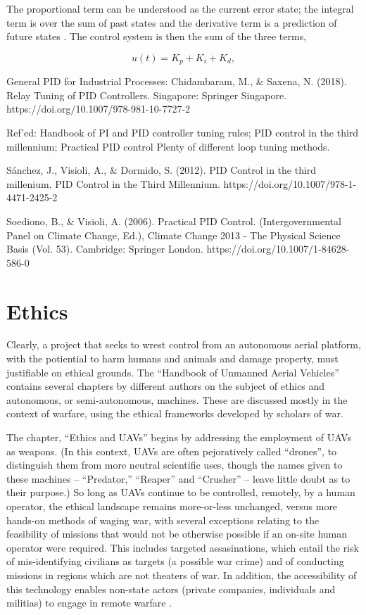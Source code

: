 The proportional term can be understood as the current error state; the integral term is over the sum of past states and the derivative term is a prediction of future states \cite{Soediono1989}. The control system is then the sum of the three terms, 

\begin{equation}
u(t) = K_p + K_i + K_d,
\end{equation}




General PID for Industrial Processes:
\cite{Saxena}
Chidambaram, M., \& Saxena, N. (2018). Relay Tuning of PID Controllers. Singapore: Springer Singapore. https://doi.org/10.1007/978-981-10-7727-2

Ref’ed: Handbook of PI and  PID controller tuning rules; PID control in the third millennium; Practical PID control
Plenty of different loop tuning methods.

\cite{Sanchez2012}
Sánchez, J., Visioli, A., \& Dormido, S. (2012). PID Control in the third millenium. PID Control in the Third Millennium. https://doi.org/10.1007/978-1-4471-2425-2

\cite{Soediono1989}
Soediono, B., \& Visioli, A. (2006). Practical PID Control. (Intergovernmental Panel on Climate Change, Ed.), Climate Change 2013 - The Physical Science Basis (Vol. 53). Cambridge: Springer London. https://doi.org/10.1007/1-84628-586-0

\section{Ethics}

Clearly, a project that seeks to wrest control from an autonomous aerial platform, with the potiential to harm humans and animals and damage property, must justifiable on ethical grounds. The ``Handbook of Unmanned Aerial Vehicles'' \cite{Valavanis2015j} contains several chapters by different authors on the subject of ethics and autonomous, or semi-autonomous, machines. These are discussed mostly in the context of warfare, using the ethical frameworks developed by scholars of war.

The chapter, ``Ethics and UAVs'' \cite{Valavanis2015bz} begins by addressing the employment of UAVs as weapons. (In this context, UAVs are often pejoratively called ``drones'', to distinguish them from more neutral scientific uses, though the names given to these machines -- ``Predator,'' ``Reaper'' and ``Crusher'' \cite{Lucas2011} -- leave little doubt as to their purpose.) So long as UAVs continue to be controlled, remotely, by a human operator, the ethical landscape remains more-or-less unchanged, versus more hands-on methods of waging war, with several exceptions relating to the feasibility of missions that would not be otherwise possible if an on-site human operator were required. This includes targeted assasinations, which entail the risk of mis-identifying civilians as targets (a possible war crime) and of conducting missions in regions which are not theaters of war. In addition, the accessibility of this technology enables non-state actors (private companies, individuals and militias) to engage in remote warfare \cite[p.2867]{Valavanis2015bz}. 

